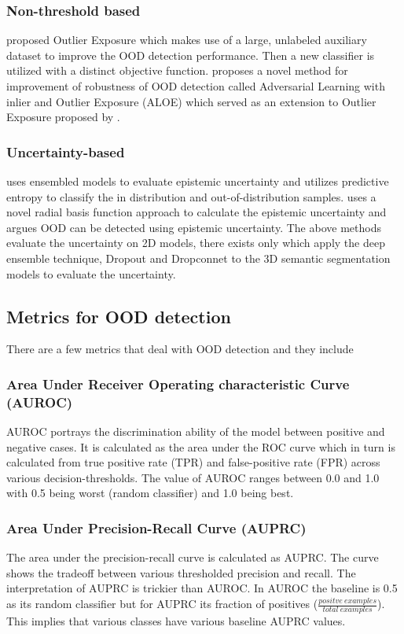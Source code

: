 \documentclass[thesis]{mas_proposal}
\begin{document}
\subsubsection{Non-threshold based}
\cite{hendrycks2018deep_OE} proposed Outlier Exposure which makes use of a large, unlabeled auxiliary dataset to improve the OOD detection performance. 
Then a new classifier is utilized with a distinct objective function. 
\cite{chen2020robust} proposes a novel method for improvement of robustness of OOD detection called Adversarial Learning with inlier and Outlier Exposure (ALOE) which served as an extension to Outlier Exposure proposed by \cite{hendrycks2018deep_OE}.
\subsubsection{Uncertainty-based}
\cite{lakshminarayanan2016simple} uses ensembled models to evaluate epistemic uncertainty and utilizes predictive entropy to classify the in distribution and out-of-distribution samples.
\cite{pmlr-v119-van-amersfoort20a} uses a novel radial basis function approach to calculate the epistemic uncertainty and argues OOD can be detected using epistemic uncertainty.
The above methods evaluate the uncertainty on 2D models, there exists only \cite{bhandary2020evaluating} which apply the deep ensemble technique, Dropout and Dropconnet to the 3D semantic segmentation models to evaluate the uncertainty.

\subsection{Metrics for OOD detection}
There are a few metrics that deal with OOD detection and they include
\subsubsection{Area Under Receiver Operating characteristic Curve (AUROC)}
AUROC portrays the discrimination ability of the model between positive and negative cases. 
It is calculated as the area under the ROC curve which in turn is calculated from true positive rate (TPR) and false-positive rate (FPR) across various decision-thresholds.
The value of AUROC ranges between 0.0 and 1.0 with 0.5 being worst (random classifier) and 1.0 being best.
\subsubsection{Area Under Precision-Recall Curve (AUPRC)}
The area under the precision-recall curve is calculated as AUPRC. 
The curve shows the tradeoff between various thresholded precision and recall.
The interpretation of AUPRC is trickier than AUROC. 
In AUROC the baseline is 0.5 as its random classifier but for AUPRC its fraction of positives ($\frac{positve\ examples}{total\ examples}$).
This implies that various classes have various baseline AUPRC values.
\end{document}
